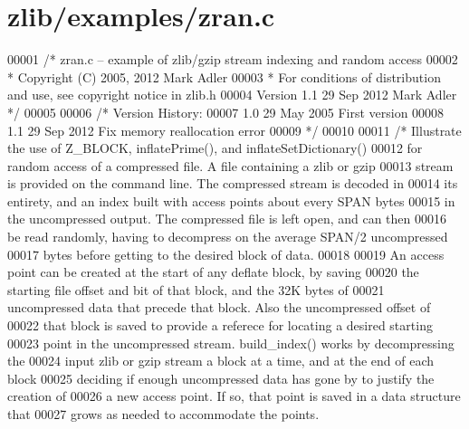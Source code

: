 \hypertarget{zlib_2examples_2zran_8c_source}{}\section{zlib/examples/zran.c}
\label{zlib_2examples_2zran_8c_source}

\begin{DoxyCode}
00001 \textcolor{comment}{/* zran.c -- example of zlib/gzip stream indexing and random access}
00002 \textcolor{comment}{ * Copyright (C) 2005, 2012 Mark Adler}
00003 \textcolor{comment}{ * For conditions of distribution and use, see copyright notice in zlib.h}
00004 \textcolor{comment}{   Version 1.1  29 Sep 2012  Mark Adler */}
00005 
00006 \textcolor{comment}{/* Version History:}
00007 \textcolor{comment}{ 1.0  29 May 2005  First version}
00008 \textcolor{comment}{ 1.1  29 Sep 2012  Fix memory reallocation error}
00009 \textcolor{comment}{ */}
00010 
00011 \textcolor{comment}{/* Illustrate the use of Z\_BLOCK, inflatePrime(), and inflateSetDictionary()}
00012 \textcolor{comment}{   for random access of a compressed file.  A file containing a zlib or gzip}
00013 \textcolor{comment}{   stream is provided on the command line.  The compressed stream is decoded in}
00014 \textcolor{comment}{   its entirety, and an index built with access points about every SPAN bytes}
00015 \textcolor{comment}{   in the uncompressed output.  The compressed file is left open, and can then}
00016 \textcolor{comment}{   be read randomly, having to decompress on the average SPAN/2 uncompressed}
00017 \textcolor{comment}{   bytes before getting to the desired block of data.}
00018 \textcolor{comment}{}
00019 \textcolor{comment}{   An access point can be created at the start of any deflate block, by saving}
00020 \textcolor{comment}{   the starting file offset and bit of that block, and the 32K bytes of}
00021 \textcolor{comment}{   uncompressed data that precede that block.  Also the uncompressed offset of}
00022 \textcolor{comment}{   that block is saved to provide a referece for locating a desired starting}
00023 \textcolor{comment}{   point in the uncompressed stream.  build\_index() works by decompressing the}
00024 \textcolor{comment}{   input zlib or gzip stream a block at a time, and at the end of each block}
00025 \textcolor{comment}{   deciding if enough uncompressed data has gone by to justify the creation of}
00026 \textcolor{comment}{   a new access point.  If so, that point is saved in a data structure that}
00027 \textcolor{comment}{   grows as needed to accommodate the points.}

\end{DoxyCode}
